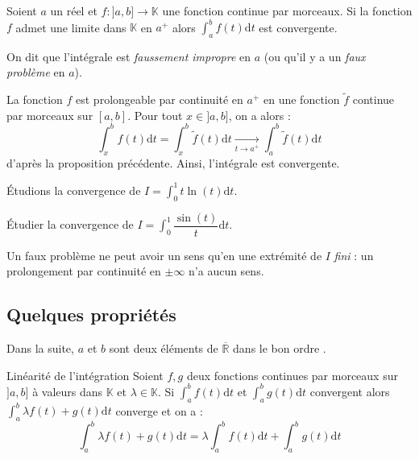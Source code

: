 \documentclass[french,11pt,twoside]{VcCours}
\newcommand{\dt}{\text{d}t}
\begin{document}
\begin{Proposition}{} Soient $a$ un réel et $f : ]a,b] \rightarrow \mathbb{K}$ une fonction continue par morceaux. Si la fonction $f$ admet une limite dans $\mathbb{K}$ en $a^{+}$ alors $\int_{a}^b f(t) \dt$ est convergente.

On dit que l'intégrale est \emph{faussement impropre} en $a$ (ou qu'il y a un \emph{faux problème} en $a$).
\end{Proposition}

\begin{Demonstration}{} La fonction $f$ est prolongeable par continuité en $a^+$ en une fonction $\tilde{f}$ continue par morceaux sur $[a,b]$. Pour tout $x \in ]a,b]$, on a alors :
$$ \int_{x}^b f(t) \dt = \int_{x}^b \tilde{f}(t) \dt \underset{t \rightarrow a^+}{\longrightarrow} \int_{a}^b \tilde{f}(t) \dt$$
d'après la proposition précédente. Ainsi, l'intégrale est convergente.
\end{Demonstration}

\begin{Exemple} Étudions la convergence de $I = \int_{0}^1 t \ln(t) \dt$.


\end{Exemple}
\newpage

\begin{ApplicationDirecte}{} Étudier la convergence de $I = \int_{0}^{1} \dfrac{\sin(t)}{t} \dt$.
\end{ApplicationDirecte}

\begin{Remarque}[\alerte]{} Un faux problème ne peut avoir un sens qu'en une extrémité de $I$ \emph{fini} : un prolongement par continuité en $ \pm \infty$ n'a aucun sens.
\end{Remarque}


\subsection{Quelques propriétés}
Dans la suite, $a$ et $b$ sont deux éléments de $\overline{\mathbb{R}}$ dans \og le bon ordre \fg .

\begin{Proposition}{Linéarité de l'intégration} 
Soient $f,g$ deux fonctions continues par morceaux sur $]a,b]$ à valeurs dans $\mathbb{K}$ et $\lambda \in \mathbb{K}$. Si $\int_{a}^b f(t) \dt$ et $\int_{a}^b g(t) \dt$ convergent alors $\int_{a}^b \lambda f(t) + g(t) \dt$ converge et on a :
$$ \int_{a}^b \lambda f(t) + g(t) \dt = \lambda \int_{a}^b f(t) \dt + \int_{a}^b g(t) \dt$$
\end{Proposition}
\end{document}
